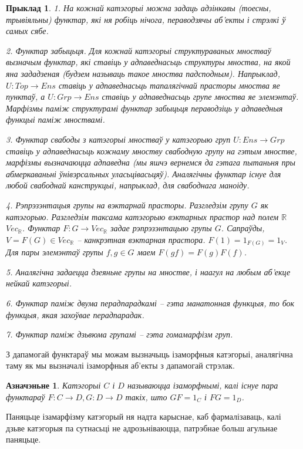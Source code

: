 \documentclass[a4paper,12pt]{book}
\newtheorem{example}{Прыклад}[section]
\newtheorem{definition}{Азначэньне}[section]
\begin{document}
\begin{example}
  1. На кожнай катэгорыі можна задаць адзінкавы (тоесны, трывіяльны) функтар, які ня робіць
  нічога, пераводзячы аб'екты і стрэлкі ў самых сябе.

  2. Функтар забыцьця. Для кожнай катэгорыі структураваных мностваў
  вызначым функтар, які ставіць у адпаведнасьць структуры мноства, на
  якой яна зададзеная (будзем называць такое мноства
  падсподным). Напрыклад, $U: Top \rightarrow Ens$ ставіць у
  адпаведнасьць тапалягічнай прасторы мноства яе пунктаў, а $U: Grp
  \rightarrow Ens$ ставіць у адпаведнасьць групе мноства яе
  элемэнтаў. Марфізмы паміж структурамі функтар забыцьця пераводзіць у
  адпаведныя функцыі паміж мноствамі.

  3. Функтар свабоды з катэгорыі мностваў у катэгорыю груп $U: Ens
  \rightarrow Grp$ ставіць у адпаведнасьць кожнаму мноству свабодную
  групу на гэтым мностве, марфізмы вызначаюцца адпаведна (мы яшчэ
  вернемся да гэтага пытаньня пры абмеркаваньні ўнівэрсальных
  уласьцівасьцяў). Аналягічны функтар існуе для любой свабоднай
  канструкцыі, напрыклад, для свабоднага маноіду.

  4. Рэпрэзэнтацыя групы на вэктарнай прасторы. Разгледзім групу $G$
  як катэгорыю. Разгледзім таксама катэгорыю вэктарных прастор над
  полем $\mathbb{R}$ $Vec_{\mathbb{R}}$. Функтар $F: G \rightarrow
  Vec_{\mathbb{R}}$ задае рэпрэзэнтацыю групы $G$. Сапраўды, $V = F(G) \in
  Vec_{\mathbb{R}}$ -- канкрэтная вэктарная прастора. $F(1) = 1_{F(G)}
  = 1_V$. Для пары элемэнтаў групы $f, g \in G$ маем $F(gf) =
  F(g)F(f)$.

  5. Аналягічна задаецца дзеяньне групы на мностве, і наагул на любым
  аб'екце нейкай катэгорыі.

  6. Функтар паміж двума перадпарадкамі -- гэта манатонная функцыя, то
  бок функцыя, якая захоўвае перадпарадак.

  7. Функтар паміж дзьвюма групамі -- гэта гомамарфізм груп.
\end{example}

З дапамогай функтараў мы можам вызначыць ізаморфныя катэгорыі,
аналягічна таму як мы вызначалі ізаморфныя аб'екты з дапамогай стрэлак.

\begin{definition}
  Катэгорыі $C$ і $D$ называюцца ізаморфнымі, калі існуе пара
  функтараў $F: C \rightarrow D, G: D \rightarrow D$ такіх, што $GF =
  1_C$ і $FG = 1_D$.
\end{definition}

Паняцьце ізамарфізму катэгорый ня надта карыснае, каб фармалізаваць,
калі дзьве катэгорыя па сутнасьці не адрозьніваюцца, патрэбнае больш
агульнае паняцьце.
\end{document}
